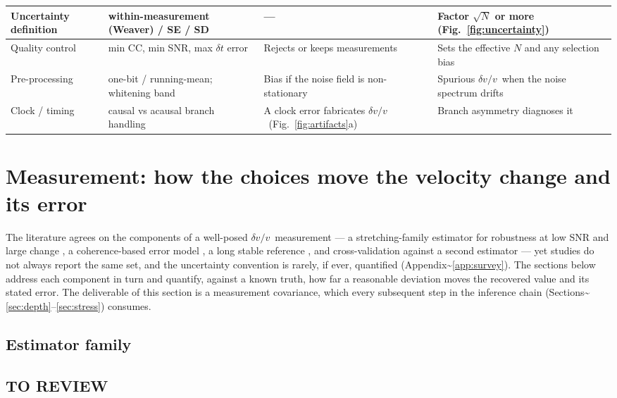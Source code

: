 \documentclass[
  referee]{gji}
\providecommand{\dvv}{\ensuremath{\delta v/v}}
\begin{document}
\begin{table}
\begin{tabularx}{\textwidth}{@{}>{\raggedright\arraybackslash}p{2.35cm} L L L@{}}
Uncertainty definition & within-measurement (Weaver) / SE / SD &
--- & Factor $\sqrt{N}$ or more (Fig.~\ref{fig:uncertainty}) \\ \hline
Quality control & min CC, min SNR, max $\delta t$ error & Rejects or keeps
measurements & Sets the effective $N$ and any selection bias \\ \hline
Pre-processing & one-bit / running-mean; whitening band & Bias if the noise
field is non-stationary & Spurious \dvv\ when the noise spectrum drifts
\citep{Zhan2013} \\ \hline
Clock / timing & causal vs acausal branch handling & A clock error fabricates
\dvv\ (Fig.~\ref{fig:artifacts}a) & Branch asymmetry diagnoses it \\
\bottomrule
\end{tabularx}
\end{table}

\section{Measurement: how the choices move the velocity change and its
error}\label{sec:results}

The literature agrees on the components of a well-posed \dvv~measurement
--- a stretching-family estimator for robustness at low SNR and large
change \citep{Mikesell2015, Yuan2021}, a coherence-based error model
\citep{Clarke2011, Weaver2011}, a long stable reference
\citep{Wang2017}, and cross-validation against a second estimator
\citep{Obermann2019} --- yet studies do not always report the same set,
and the uncertainty convention is rarely, if ever, quantified
(Appendix\textasciitilde{}\ref{app:survey}). The sections below address
each component in turn and quantify, against a known truth, how far a
reasonable deviation moves the recovered value and its stated error. The
deliverable of this section is a measurement covariance, which every
subsequent step in the inference chain
(Sections\textasciitilde{}\ref{sec:depth}--\ref{sec:stress}) consumes.

\subsection{Estimator family}\label{sec:methods-fig}

\subsection{TO REVIEW}\label{to-review}
\end{document}
